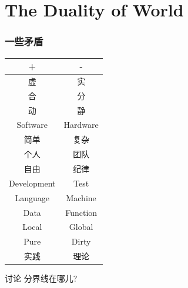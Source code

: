 \section{The Duality of World}
\begin{frame}
  \frametitle{一些矛盾}
  \begin{tabular}{c|c}
    +           & - \\ 
    \hline
    \hline
    虚          & 实 \\
    合          & 分 \\
    动          & 静 \\
    Software    & Hardware \\
    \hline
    简单        & 复杂 \\
    个人        & 团队 \\
    自由        & 纪律 \\
    Development & Test \\
    \hline
    Language    & Machine \\
    Data        & Function \\
    Local       & Global \\
    Pure        & Dirty \\
    \hline
    实践        & 理论
  \end{tabular}
  \begin{block}{讨论}
    \alert{分界线在哪儿?}
  \end{block}
\end{frame}

